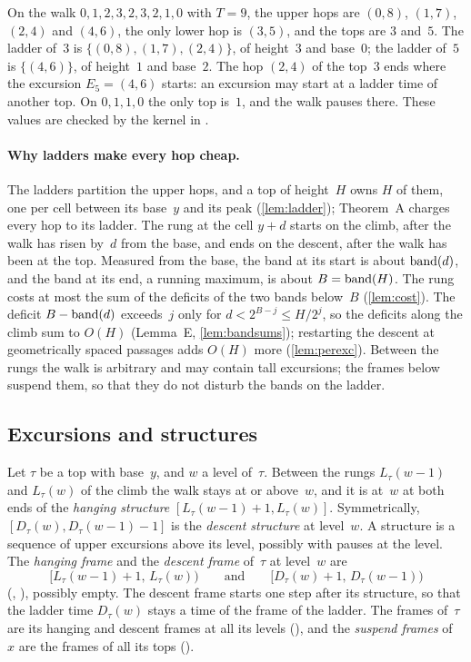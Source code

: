 \begin{example}\label{ex:ladders}
On the walk $0,1,2,3,2,3,2,1,0$ with $T=9$, the upper hops are $(0,8)$, $(1,7)$, $(2,4)$ and $(4,6)$, the only lower hop is
$(3,5)$, and the tops are $3$ and~$5$. The ladder of~$3$ is $\{(0,8),(1,7),(2,4)\}$, of height~$3$ and base~$0$; the ladder
of~$5$ is $\{(4,6)\}$, of height~$1$ and base~$2$. The hop $(2,4)$ of the top~$3$ ends where the excursion $E_5=(4,6)$ starts:
an excursion may start at a ladder time of another top. On $0,1,1,0$ the only top is~$1$, and the walk pauses there. These
values are checked by the kernel in .
\end{example}

\paragraph{Why ladders make every hop cheap.} The ladders partition the upper hops, and a top of height~$H$ owns $H$ of them,
one per cell between its base~$y$ and its peak (\cref{lem:ladder}); Theorem~A charges every hop to its ladder. The rung at the
cell $y+d$ starts on the climb, after the walk has risen by~$d$ from the base, and ends on the descent, after the walk has been
at the top. Measured from the base, the band at its start is about $\operatorname{band}(d)$, and the band at its end, a running maximum, is
about $B=\operatorname{band}(H)$. The rung costs at most the sum of the deficits of the two bands below~$B$ (\cref{lem:cost}). The deficit
$B-\operatorname{band}(d)$ exceeds~$j$ only for $d<2^{B-j}\le H/2^j$, so the deficits along the climb sum to $O(H)$ (Lemma~E,
\cref{lem:bandsums}); restarting the descent at geometrically spaced passages adds $O(H)$ more (\cref{lem:perexc}). Between the
rungs the walk is arbitrary and may contain tall excursions; the frames below suspend them, so that they do not disturb the bands
on the ladder.

\subsection{Excursions and structures}\label{sec:ladders-exc}

Let $\tau$ be a top with base~$y$, and $w$ a level of~$\tau$. Between the rungs $L_\tau(w-1)$ and $L_\tau(w)$ of the climb the
walk stays at or above~$w$, and it is at~$w$ at both ends of the \emph{hanging structure} $[L_\tau(w-1)+1,L_\tau(w)]$.
Symmetrically, $[D_\tau(w),D_\tau(w-1)-1]$ is the \emph{descent structure} at level~$w$. A structure is a sequence of upper
excursions above its level, possibly with pauses at the level. The \emph{hanging frame} and the \emph{descent frame} of~$\tau$ at
level~$w$ are
\[
  [L_\tau(w-1)+1,\,L_\tau(w))\qquad\text{and}\qquad[D_\tau(w)+1,\,D_\tau(w-1))
\]
(, ), possibly empty. The descent frame starts one step after its structure, so that the ladder
time $D_\tau(w)$ stays a time of the frame of the ladder. The frames of~$\tau$ are its hanging and descent frames at all its
levels (), and the \emph{suspend frames} of~$x$ are the frames of all its tops ().

